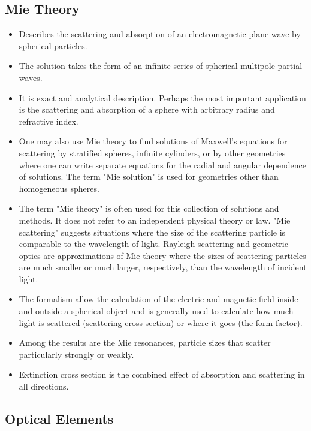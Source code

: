 \subsection{Mie Theory}
\begin{itemize}
    \item Describes the scattering and absorption of an electromagnetic plane wave by spherical particles.
    \item The solution takes the form of an infinite series of spherical multipole partial waves.
    \item It is exact and analytical description. Perhaps the most important application is the scattering and absorption of a sphere with arbitrary radius and refractive index.
    \item One may also use Mie theory to find solutions of Maxwell's equations for scattering by stratified spheres, infinite cylinders, or by other geometries where one can write separate equations for the radial and angular dependence of solutions. The term "Mie solution" is used for geometries other than homogeneous spheres.
    \item The term "Mie theory" is often used for this collection of solutions and methods. It does not refer to an independent physical theory or law.
    \itme "Mie scattering" suggests situations where the size of the scattering particle is comparable to the wavelength of light. Rayleigh scattering and geometric optics are approximations of Mie theory where the sizes of scattering particles are much smaller or much larger, respectively, than the wavelength of incident light.
    \item The formalism allow the calculation of the electric and magnetic field inside and outside a spherical object and is generally used to calculate how much light is scattered (scattering cross section) or where it goes (the form factor). 
    \item Among the results are the Mie resonances, particle sizes that scatter particularly strongly or weakly.
    \item Extinction cross section is the combined effect of absorption and scattering in all directions.
\end{itemize}


\subsection{Optical Elements}

